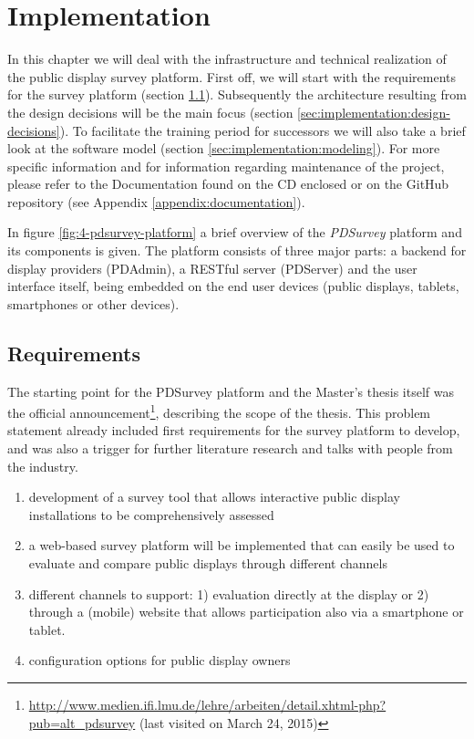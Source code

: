 \section{Implementation}
\label{chapter:implementation}
\label{sec:implementation}

	In this chapter we will deal with the infrastructure and technical realization of the public display survey platform. First off, we will start with the requirements for the survey platform (section \ref{sec:implementation:requirements}). Subsequently the architecture resulting from the design decisions will be the main focus (section \ref{sec:implementation:design-decisions}). To facilitate the training period for successors we will also take a brief look at the software model (section \ref{sec:implementation:modeling}). For more specific information and for information regarding maintenance of the project, please refer to the Documentation found on the CD enclosed or on the GitHub repository (see Appendix \ref{appendix:documentation}).

	In figure \ref{fig:4-pdsurvey-platform} a brief overview of the \textit{PDSurvey} platform and its components is given. The platform consists of three major parts: a backend for display providers (PDAdmin), a RESTful server (PDServer) and the user interface itself, being embedded on the end user devices (public displays, tablets, smartphones or other devices). 






\subsection{Requirements}
\label{sec:implementation:requirements}

	The starting point for the PDSurvey platform and the Master's thesis itself was the official announcement\footnote{\url{http://www.medien.ifi.lmu.de/lehre/arbeiten/detail.xhtml-php?pub=alt_pdsurvey} (last visited on March 24, 2015)}, describing the scope of the thesis. This problem statement already included first requirements for the survey platform to develop, and was also a trigger for further literature research and talks with people from the industry.

	\begin{enumerate}[itemsep=0pt] 
	\item development of a survey tool that allows interactive public display installations to be comprehensively assessed 
	\item a web-based survey platform will be implemented that can easily be used to evaluate and compare public displays through different channels 
	\item different channels to support: 1) evaluation directly at
	the display or 2) through a (mobile) website that allows participation also via a smartphone
	or tablet.
	\item configuration options for public display owners
	\end{enumerate}

